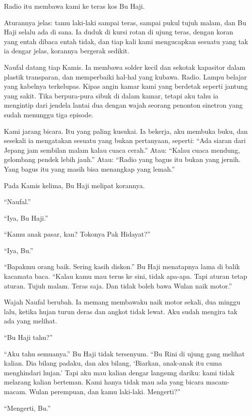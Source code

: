 \documentclass[11pt,twoside,openany]{book}
\makeatletter
\newcommand{\scenebreak}{\par\vspace{0.9em}{\centering\textsc{*\hspace{0.7em}*\hspace{0.7em}*}\par}\vspace{0.9em}\@afterindentfalse\@afterheading}
\makeatother
\begin{document}
\scenebreak
Radio itu membawa kami ke teras kos Bu Haji.

Aturannya jelas: tamu laki-laki sampai teras, sampai pukul tujuh malam, dan Bu Haji selalu ada di sana. Ia duduk di kursi rotan di ujung teras, dengan koran yang entah dibaca entah tidak, dan tiap kali kami mengucapkan sesuatu yang tak ia dengar jelas, korannya bergerak sedikit.

Naufal datang tiap Kamis. Ia membawa solder kecil dan sekotak kapasitor dalam plastik transparan, dan memperbaiki hal-hal yang kubawa. Radio. Lampu belajar yang kabelnya terkelupas. Kipas angin kamar kami yang berdetak seperti jantung yang sakit. Tika berpura-pura sibuk di dalam kamar, tetapi aku tahu ia mengintip dari jendela lantai dua dengan wajah seorang penonton sinetron yang sudah menunggu tiga episode.

Kami jarang bicara. Itu yang paling kusukai. Ia bekerja, aku membuka buku, dan sesekali ia mengatakan sesuatu yang bukan pertanyaan, seperti: ``Ada siaran dari Jepang jam sembilan malam kalau cuaca cerah.'' Atau: ``Kalau cuaca mendung, gelombang pendek lebih jauh.'' Atau: ``Radio yang bagus itu bukan yang jernih. Yang bagus itu yang masih bisa menangkap yang lemah.''

Pada Kamis kelima, Bu Haji melipat korannya.

``Naufal.''

``Iya, Bu Haji.''

``Kamu anak pasar, kan? Tokonya Pak Hidayat?''

``Iya, Bu.''

``Bapakmu orang baik. Sering kasih diskon.'' Bu Haji menatapnya lama di balik kacamata baca. ``Kalau kamu mau terus ke sini, tidak apa-apa. Tapi aturan tetap aturan. Tujuh malam. Teras saja. Dan tidak boleh bawa Wulan naik motor.''

Wajah Naufal berubah. Ia memang membawaku naik motor sekali, dua minggu lalu, ketika hujan turun deras dan angkot tidak lewat. Aku sudah mengira tak ada yang melihat.

``Bu Haji tahu?''

``Aku tahu semuanya.'' Bu Haji tidak tersenyum. ``Bu Rini di ujung gang melihat kalian. Dia bilang padaku, dan aku bilang, `Biarkan, anak-anak itu cuma menghindari hujan.' Tapi aku mau kalian dengar langsung dariku: kami tidak melarang kalian berteman. Kami hanya tidak mau ada yang bicara macam-macam. Wulan perempuan, dan kamu laki-laki. Mengerti?''

``Mengerti, Bu.''
\end{document}

